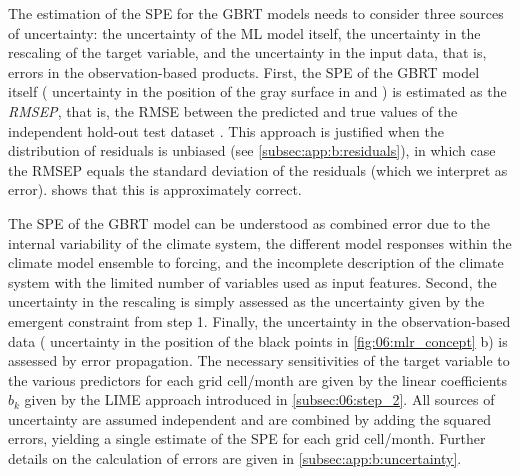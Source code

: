 The estimation of the \acf{SPE} for the \ac{GBRT} models needs to consider
three sources of uncertainty: the uncertainty of the \ac{ML} model itself, the
uncertainty in the rescaling of the target variable, and the uncertainty in the
input data, that is, errors in the observation-based products. First, the
\ac{SPE} of the \ac{GBRT} model itself (\ie{} uncertainty in the position of
the gray surface in 
 and
) is estimated as the
\emph{\acf{RMSEP}}, that is, the \ac{RMSE} between the predicted and true
values of the independent hold-out test dataset \autocite{Bishop2006}. This
approach is justified when the distribution of residuals is unbiased (see
\cref{subsec:app:b:residuals}), in which case the \ac{RMSEP} equals the
standard deviation of the residuals (which we interpret as error).
 shows that this is approximately correct.

The \ac{SPE} of the \ac{GBRT} model can be understood as combined error due to
the internal variability of the climate system, the different model responses
within the climate model ensemble to forcing, and the incomplete description of
the climate system with the limited number of variables used as input features.
Second, the uncertainty in the rescaling is simply assessed as the uncertainty
given by the emergent constraint from step 1. Finally, the uncertainty in the
observation-based data (\ie{} uncertainty in the position of the black points
in \cref{fig:06:mlr_concept}{\color{BrownRed} b}) is assessed by error
propagation. The necessary sensitivities of the target variable to the various
predictors for each grid cell/month are given by the linear coefficients $b_k$
given by the \ac{LIME} approach introduced in \cref{subsec:06:step_2}. All
sources of uncertainty are assumed independent and are combined by adding the
squared errors, yielding a single estimate of the \ac{SPE} for each grid
cell/month. Further details on the calculation of errors are given in
\cref{subsec:app:b:uncertainty}.

